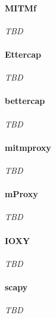 \paragraph{MITMf} \emph{TBD}
\paragraph{Ettercap} \emph{TBD}
\paragraph{bettercap} \emph{TBD}
\paragraph{mitmproxy} \emph{TBD}
\paragraph{mProxy} \emph{TBD}
\paragraph{IOXY} \emph{TBD}
\paragraph{scapy} \emph{TBD}

